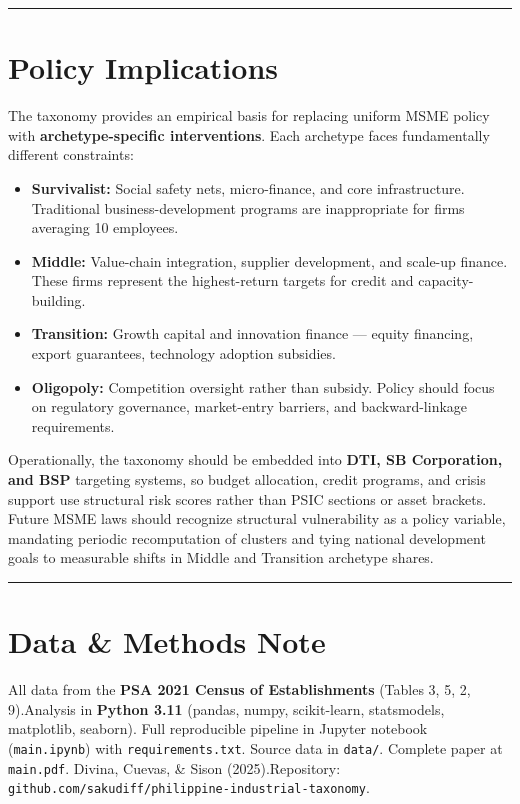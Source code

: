 \documentclass[10pt]{article}
\begin{document}
\vspace{0.2em}
\hrule
\vspace{0.25em}

%
%
\section*{Policy Implications}

The taxonomy provides an empirical basis for replacing uniform MSME policy with \textbf{archetype-specific interventions}. Each archetype faces fundamentally different constraints:

\begin{itemize}[nosep]
    \item \textbf{Survivalist:} Social safety nets, micro-finance, and core infrastructure. Traditional business-development programs are inappropriate for firms averaging 10 employees.
    \item \textbf{Middle:} Value-chain integration, supplier development, and scale-up finance. These firms represent the highest-return targets for credit and capacity-building.
    \item \textbf{Transition:} Growth capital and innovation finance --- equity financing, export guarantees, technology adoption subsidies.
    \item \textbf{Oligopoly:} Competition oversight rather than subsidy. Policy should focus on regulatory governance, market-entry barriers, and backward-linkage requirements.
\end{itemize}

Operationally, the taxonomy should be embedded into \textbf{DTI, SB Corporation, and BSP} targeting systems, so budget allocation, credit programs, and crisis support use structural risk scores rather than PSIC sections or asset brackets. Future MSME laws should recognize structural vulnerability as a policy variable, mandating periodic recomputation of clusters and tying national development goals to measurable shifts in Middle and Transition archetype shares.

\vspace{0.2em}
\hrule
\vspace{0.25em}

%
%
\section*{Data \& Methods Note}

All data from the \textbf{PSA 2021 Census of Establishments} (Tables 3, 5, 2, 9).\newline Analysis in \textbf{Python 3.11} (pandas, numpy, scikit-learn, statsmodels, matplotlib, seaborn). Full reproducible pipeline in Jupyter notebook (\texttt{main.ipynb}) with \texttt{requirements.txt}. Source data in \texttt{data/}. Complete paper at \texttt{main.pdf}. Divina, Cuevas, \& Sison (2025).\newline Repository: \texttt{github.com/sakudiff/philippine-industrial-taxonomy}.
\end{document}
